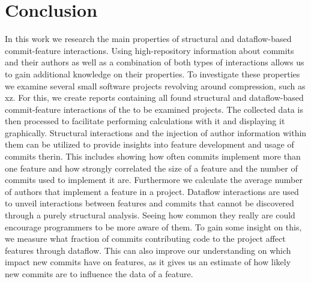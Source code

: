 \section*{Conclusion}\label{ch:conclusion}

In this work we research the main properties of structural and dataflow-based commit-feature interactions.
Using high-repository information about commits and their authors as well as a combination of both types of interactions allows us to gain additional knowledge on their properties.
To investigate these properties we examine several small software projects revolving around compression, such as xz.
For this, we create reports containing all found structural and dataflow-based commit-feature interactions of the to be  examined projects.
The collected data is then processed to facilitate performing calculations with it and displaying it graphically.
Structural interactions and the injection of author information within them can be utilized to provide insights into feature development and usage of commits therin.
This includes showing how often commits implement more than one feature and how strongly correlated the size of a feature and the number of commits used to implement it are.
Furthermore we calculate the average number of authors that implement a feature in a project.
Dataflow interactions are used to unveil interactions between features and commits that cannot be discovered through a purely structural analysis.
Seeing how common they really are could encourage programmers to be more aware of them.
To gain some insight on this, we measure what fraction of commits contributing code to the project affect features through dataflow.
This can also improve our understanding on which impact new commits have on features, as it gives us an estimate of how likely new commits are to influence the data of a feature. 



\iffalse
Research involving interactions inbetween features and commits has shown that investigating interactions between program entities is a topic worthy of study.
For example, Sattler et al used dataflow commit interactions to allow for a more detailed understanding of author interactions in software projects. 
Commit interactions also make it possible to identify seemingly insignificant changes that have a central impact on the program.
Kolesnikov et al provides further indication for the wide range of subjects interactions can be used for.
Particularly, they argued that control-flow interactions between features can help predict performance interactions between them. 

We extend VaRA to implement the detection of structural and dataflow-based commit-feature interactions.
As we want to investigate several projects, we create reports containing all found interactions for them.
These reports are created inside the VaRA-Tool-Suite and contain either all structural or dataflow-based interactions of a software project.
The VaRA-Tool-Suite also allows use to work with the collected data and enrich it with high-repository information, such as information on which author a commit belongs to.
\fi

